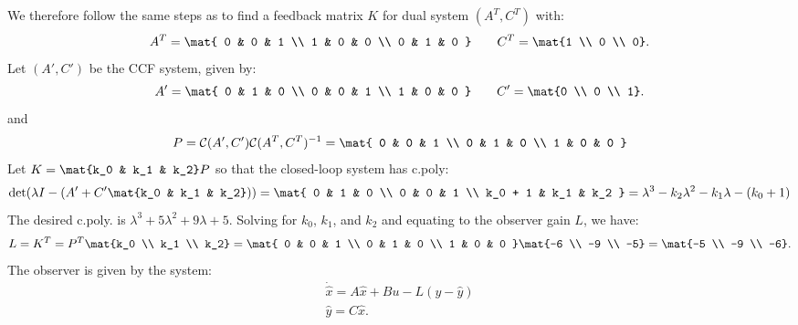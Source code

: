 \documentclass{homework}
\newcommand{\control}{\mathcal{C}}
\begin{document}
We therefore follow the same steps as to find a feedback matrix $K$ for dual
system $(A^T, C^T)$ with:
\begin{equation*}
    A^T = \mat{
        0 & 0 & 1 \\
        1 & 0 & 0 \\
        0 & 1 & 0
    } \qquad C^T = \mat{1 \\ 0 \\ 0}.
\end{equation*}
Let $(A', C')$ be the CCF system, given by:
\begin{equation*}
    A' = \mat{
        0 & 1 & 0 \\
        0 & 0 & 1 \\
        1 & 0 & 0
    } \qquad C' = \mat{0 \\ 0 \\ 1}.
\end{equation*}
and
\begin{equation*}
    P = \control(A', C')\control(A^T, C^T)^{-1} = \mat{
        0 & 0 & 1 \\
        0 & 1 & 0 \\
        1 & 0 & 0
    }
\end{equation*}
Let $K = \mat{k_0 & k_1 & k_2} P$ so that the closed-loop system has c.poly:
\begin{equation*}
    \det(\lambda I - (A' + C' \mat{k_0 & k_1 & k_2})) = \mat{
        0 & 1 & 0 \\
        0 & 0 & 1 \\
        k_0 + 1 & k_1 & k_2 
    } = \lambda^3 - k_2 \lambda^2 - k_1 \lambda - (k_0 + 1)
\end{equation*}
The desired c.poly. is $\lambda^3 + 5\lambda^2 + 9\lambda + 5$. Solving for
$k_0$, $k_1$, and $k_2$ and equating to the observer gain $L$, we have:
\begin{equation*}
    L = K^T = P^T \mat{k_0 \\ k_1 \\ k_2} = \mat{
        0 & 0 & 1 \\
        0 & 1 & 0 \\
        1 & 0 & 0
    } \mat{-6 \\ -9 \\ -5} = \mat{-5 \\ -9 \\ -6}.
\end{equation*}
The observer is given by the system:
\begin{align*}
    \dot{\hat{x}} = A\hat{x} + Bu - L (y - \hat{y}) \\
    \hat{y} = C \hat{x}.
\end{align*}
\end{document}
